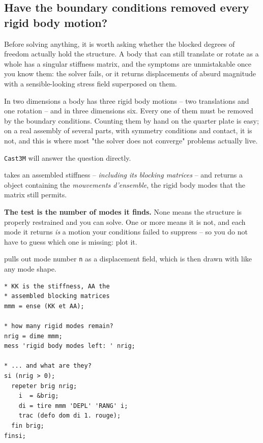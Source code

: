 \subsection{Have the boundary conditions removed every rigid body motion?}
\label{sec:elas:ense}

%
%
Before solving anything, it is worth asking whether the blocked degrees of
freedom actually hold the structure. A body that can still translate or
rotate as a whole has a singular stiffness matrix, and the symptoms are
unmistakable once you know them: the solver fails, or it returns
displacements of absurd magnitude with a sensible-looking stress field
superposed on them.

In two dimensions a body has three rigid body motions -- two translations and
one rotation -- and in three dimensions six. Every one of them must be
removed by the boundary conditions. Counting them by hand on the quarter
plate is easy; on a real assembly of several parts, with symmetry conditions
and contact, it is not, and this is where most "the solver does not converge"
problems actually live.

\texttt{Cast3M} will answer the question directly.

\begin{castemcom}
 
takes an assembled stiffness -- \emph{including its blocking matrices} -- and
returns a  object containing the \emph{mouvements d'ensemble},
the rigid body modes that the matrix still permits.

\medskip
\textbf{The test is the number of modes it finds.} None means the structure
is properly restrained and you can solve. One or more means it is not, and
each mode it returns \emph{is} a motion your  conditions failed to
suppress -- so you do not have to guess which one is missing: plot it.

  pulls out
mode number \texttt{n} as a displacement field, which is then drawn with
 like any mode shape.
\end{castemcom}
\begin{castemlines}
\begin{verbatim}
* KK is the stiffness, AA the
* assembled blocking matrices
mmm = ense (KK et AA);

* how many rigid modes remain?
nrig = dime mmm;
mess 'rigid body modes left: ' nrig;

* ... and what are they?
si (nrig > 0);
  repeter brig nrig;
    i  = &brig;
    di = tire mmm 'DEPL' 'RANG' i;
    trac (defo dom di 1. rouge);
  fin brig;
finsi;
\end{verbatim}
\end{castemlines}

